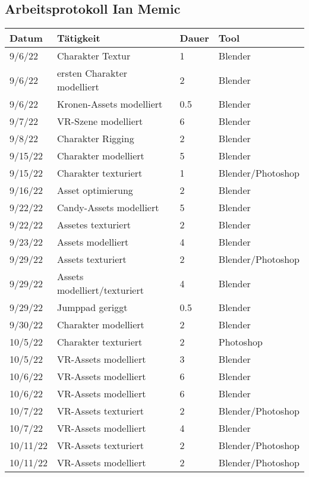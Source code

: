 \subsection{Arbeitsprotokoll Ian Memic}
\begin{longtable}{|p{1.5cm}|p{5.5cm}|p{1.2cm}|p{3.2cm}|}
	\hline
	\textbf{Datum} & \textbf{Tätigkeit} & \textbf{Dauer} & \textbf{Tool} \\ \hline
	\endhead
	9/6/22 & Charakter Textur & 1 & Blender \\ \hline
	9/6/22 & ersten Charakter modelliert & 2 & Blender \\ \hline
	9/6/22 & Kronen-Assets modelliert & 0.5 & Blender \\ \hline
	9/7/22 & VR-Szene modelliert & 6 & Blender \\ \hline
	9/8/22 & Charakter Rigging & 2 & Blender \\ \hline
	9/15/22 & Charakter modelliert & 5 & Blender \\ \hline
	9/15/22 & Charakter texturiert & 1 & Blender/Photoshop \\ \hline
	9/16/22 & Asset optimierung & 2 & Blender \\ \hline
	9/22/22 & Candy-Assets modelliert & 5 & Blender \\ \hline
	9/22/22 & Assetes texturiert & 2 & Blender \\ \hline
	9/23/22 & Assets modelliert & 4 & Blender \\ \hline
	9/29/22 & Assets texturiert & 2 & Blender/Photoshop \\ \hline
	9/29/22 & Assets modelliert/texturiert & 4 & Blender \\ \hline
	9/29/22 & Jumppad geriggt & 0.5 & Blender \\ \hline
	9/30/22 & Charakter modelliert & 2 & Blender \\ \hline
	10/5/22 & Charakter texturiert & 2 & Photoshop \\ \hline
	10/5/22 & VR-Assets modelliert & 3 & Blender \\ \hline
	10/6/22 & VR-Assets modelliert & 6 & Blender \\ \hline
	10/6/22 & VR-Assets modelliert & 6 & Blender \\ \hline
	10/7/22 & VR-Assets texturiert & 2 & Blender/Photoshop \\ \hline
	10/7/22 & VR-Assets modelliert & 4 & Blender \\ \hline
	10/11/22 & VR-Assets texturiert & 2 & Blender/Photoshop \\ \hline
	10/11/22 & VR-Assets modelliert & 2 & Blender/Photoshop \\ \hline

\end{longtable}
